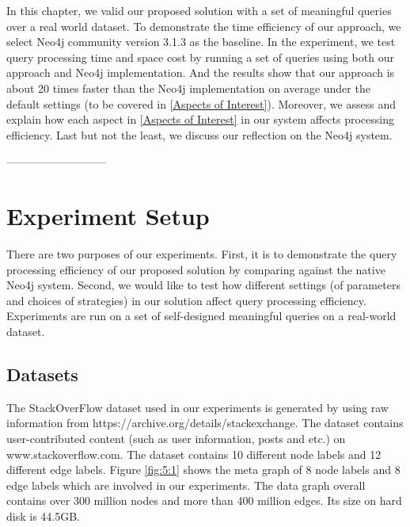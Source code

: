In this chapter, we valid our proposed solution with a set of meaningful queries over a real world dataset. To demonstrate the time efficiency of our approach, we select Neo4j community version 3.1.3 as the baseline. In the experiment, we test query processing time and space cost by running a set of queries using both our approach and Neo4j implementation. And the results show that our approach is about 20 times faster than the Neo4j implementation on average under the default settings (to be covered in \ref{Aspects of Interest}). Moreover, we assess and explain how each aspect in \ref{Aspects of Interest} in our system affects processing efficiency. Last but not the least, we discuss our reflection on the Neo4j system. 

---------------------------
\section{Experiment Setup}


There are two purposes of our experiments. First, it is to demonstrate the query processing efficiency of our proposed solution by comparing against the native Neo4j system. Second, we would like to test how different settings (of parameters and choices of strategies) in our solution affect query processing efficiency. Experiments are run on a set of self-designed meaningful queries on a real-world dataset.  

\subsection{Datasets}

The StackOverFlow dataset used in our experiments is generated by using raw information from https://archive.org/details/stackexchange. The dataset contains user-contributed content (such as user information, posts and etc.) on www.stackoverflow.com. The dataset contains 10 different node labels and 12 different edge labels.  Figure \ref{fig:5:1} shows the meta graph of 8 node labels and 8 edge labels which are involved in our experiments. The data graph overall contains over 300 million nodes and more than 400 million edges. Its size on hard disk is 44.5GB. 
\par

